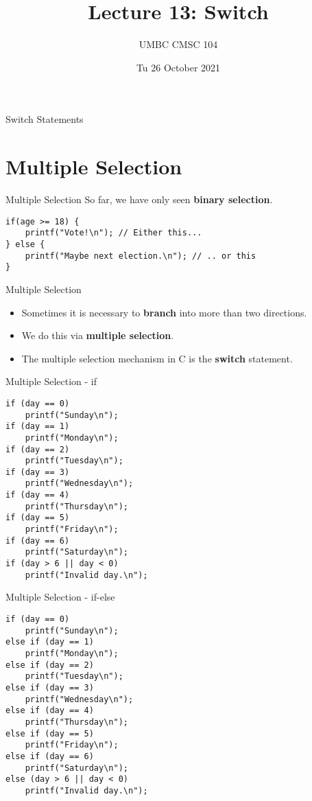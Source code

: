 \documentclass[graphics]{beamer}
\title{Lecture 13: Switch}
\author{UMBC CMSC 104}
\date{Tu 26 October 2021}
\begin{document}
\begin{frame}{}
\centering
    Switch Statements
\end{frame}

\frame{\tableofcontents}

\section{Multiple Selection}
\begin{frame}[fragile]{Multiple Selection}
    So far, we have only seen \textbf{binary selection}.
    \begin{verbatim}
if(age >= 18) {
    printf("Vote!\n"); // Either this...
} else {
    printf("Maybe next election.\n"); // .. or this
}
    \end{verbatim}
\end{frame}

\begin{frame}{Multiple Selection}
    \begin{itemize}
        \item Sometimes it is necessary to \textbf{branch} into more than two directions.
        \item We do this via \textbf{multiple selection}.
        \item The multiple selection mechanism in C is the \textbf{switch} statement.
    \end{itemize}
\end{frame}

\begin{frame}[fragile]{Multiple Selection - if}
    \begin{verbatim}
if (day == 0)
    printf("Sunday\n");
if (day == 1)
    printf("Monday\n");
if (day == 2)
    printf("Tuesday\n");
if (day == 3)
    printf("Wednesday\n");
if (day == 4)
    printf("Thursday\n");
if (day == 5)
    printf("Friday\n");
if (day == 6)
    printf("Saturday\n");
if (day > 6 || day < 0)
    printf("Invalid day.\n");
    \end{verbatim}
\end{frame}

\begin{frame}[fragile]{Multiple Selection - if-else}
    \begin{verbatim}
if (day == 0)
    printf("Sunday\n");
else if (day == 1)
    printf("Monday\n");
else if (day == 2)
    printf("Tuesday\n");
else if (day == 3)
    printf("Wednesday\n");
else if (day == 4)
    printf("Thursday\n");
else if (day == 5)
    printf("Friday\n");
else if (day == 6)
    printf("Saturday\n");
else (day > 6 || day < 0)
    printf("Invalid day.\n");
    \end{verbatim}
\end{frame}
\end{document}

